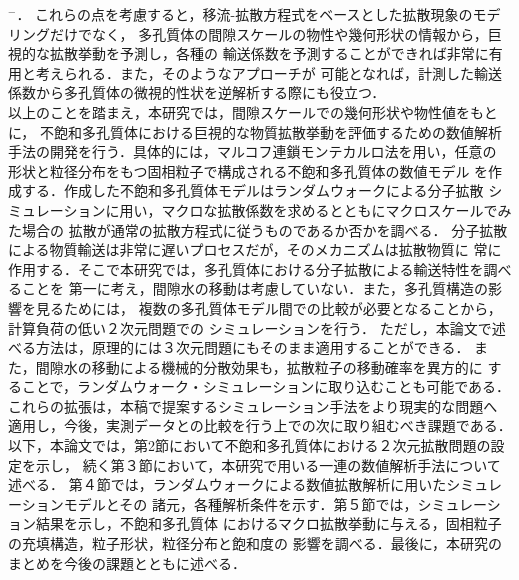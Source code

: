 \cite{Rubin}$^-$\cite{Upscaling_review}．
これらの点を考慮すると，移流-拡散方程式をベースとした拡散現象のモデリングだけでなく，
多孔質体の間隙スケールの物性や幾何形状の情報から，巨視的な拡散挙動を予測し，各種の
輸送係数を予測することができれば非常に有用と考えられる．また，そのようなアプローチが
可能となれば，計測した輸送係数から多孔質体の微視的性状を逆解析する際にも役立つ．\\
\hspace{\parindent}
以上のことを踏まえ，本研究では，間隙スケールでの幾何形状や物性値をもとに，
不飽和多孔質体における巨視的な物質拡散挙動を評価するための数値解析
手法の開発を行う．具体的には，マルコフ連鎖モンテカルロ法を用い，任意の
形状と粒径分布をもつ固相粒子で構成される不飽和多孔質体の数値モデル
を作成する．作成した不飽和多孔質体モデルはランダムウォークによる分子拡散
シミュレーションに用い，マクロな拡散係数を求めるとともにマクロスケールでみた場合の
拡散が通常の拡散方程式に従うものであるか否かを調べる．
分子拡散による物質輸送は非常に遅いプロセスだが，そのメカニズムは拡散物質に
常に作用する．そこで本研究では，多孔質体における分子拡散による輸送特性を調べることを
第一に考え，間隙水の移動は考慮していない．また，多孔質構造の影響を見るためには，
複数の多孔質体モデル間での比較が必要となることから，計算負荷の低い２次元問題での
シミュレーションを行う．
ただし，本論文で述べる方法は，原理的には３次元問題にもそのまま適用することができる．
また，間隙水の移動による機械的分散効果も，拡散粒子の移動確率を異方的に
することで，ランダムウォーク・シミュレーションに取り込むことも可能である．
これらの拡張は，本稿で提案するシミュレーション手法をより現実的な問題へ
適用し，今後，実測データとの比較を行う上での次に取り組むべき課題である．\\
\hspace{\parindent}
以下，本論文では，第2節において不飽和多孔質体における２次元拡散問題の設定を示し，
続く第３節において，本研究で用いる一連の数値解析手法について述べる．
第４節では，ランダムウォークによる数値拡散解析に用いたシミュレーションモデルとその
諸元，各種解析条件を示す．第５節では，シミュレーション結果を示し，不飽和多孔質体
におけるマクロ拡散挙動に与える，固相粒子の充填構造，粒子形状，粒径分布と飽和度の
影響を調べる．最後に，本研究のまとめを今後の課題とともに述べる．\\
\hspace{\parindent}
